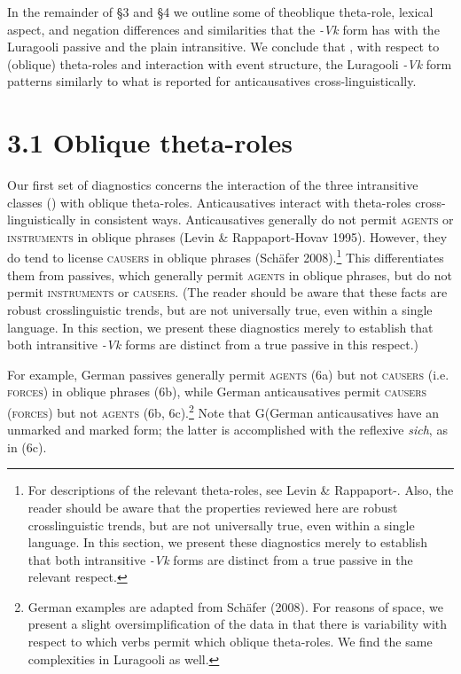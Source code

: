 \documentclass[output=paper]{langsci/langscibook}
\begin{document}
\begin{styleTabellenberschrift}
In the remainder of §3 and §4%
%
 we outline some of theoblique theta-role, lexical aspect, and negation differences and similarities that the \textit{{}-}\textit{Vk} form has with the Luragooli passive and the plain intransitive. We conclude that , with respect to (oblique) theta-roles and interaction with event structure, the Luragooli \textit{{}-}\textit{Vk} form patterns similarly to what is reported for anticausatives cross-linguistically.

\section{3.1 Oblique theta-roles}

Our first set of diagnostics concerns the interaction of the three intransitive classes () with oblique theta-roles. Anticausatives interact with theta-roles cross-linguistically in consistent ways. Anticausatives generally do not permit \textsc{a}\textsc{gents }or \textsc{i}\textsc{nstruments }in oblique phrases (Levin \& Rappaport-Hovav 1995). However, they do tend to license \textsc{c}\textsc{ausers} in oblique phrases (Schäfer 2008).\footnote{ For descriptions of the relevant theta-roles, see Levin \& Rappaport-\citet{Hovav1995}. Also, the reader should be aware that the properties reviewed here are robust crosslinguistic trends, but are not universally true, even within a single language. In this section, we present these diagnostics merely to establish that both intransitive \textit{{}-Vk} forms are distinct from a true passive in the relevant respect.} This differentiates them from passives, which generally permit \textsc{agents} in oblique phrases, but do not permit \textsc{instruments }or \textsc{causers}. (The reader should be aware that these facts are robust crosslinguistic trends, but are not universally true, even within a single language. In this section, we present these diagnostics merely to establish that both intransitive \textit{{}-Vk} forms are distinct from a true passive in this respect.)%
%

For example, German passives generally permit \textsc{agents (6}a) but not \textsc{causers }\textsc{(}i.e. \textsc{force}\textsc{s}) in oblique phrases\textsc{ }(6b), while German anticausatives permit \textsc{causers} (\textsc{forces}) but not \textsc{agents }(6b, 6c).\footnote{{ }German examples are adapted from Schäfer (2008). For reasons of space, we present a slight oversimplification of the data in that there is variability with respect to which verbs permit which oblique theta-roles. We find the same complexities in Luragooli as well.}\textsuperscript{ }\textsuperscript{ }Note that G(German anticausatives have an unmarked and marked form; the latter is accomplished with the reflexive \textit{sich}, as in (6c).


\end{styleTabellenberschrift}
\end{document}
